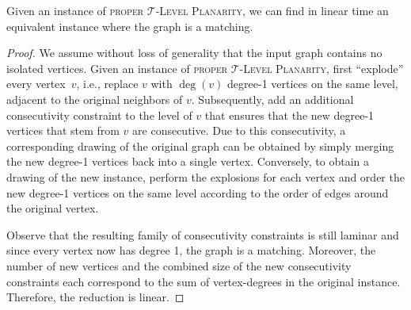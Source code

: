 \documentclass[runningheads]{llncs}
\newcommand{\tlp}{\textsc{proper $\mathcal T$-Level Planarity}\xspace}
\begin{document}
\begin{lemma}
  \label{lem:level-monotone}
  Given an instance of \tlp, we can find in linear time an equivalent instance where the graph is a matching.
\end{lemma}
\begin{proof}
  We assume without loss of generality that the input graph contains no isolated vertices.
  Given an instance of \tlp, first ``explode'' every vertex~$v$, i.e., replace $v$ with $\deg(v)$ degree-1 vertices on the same level, adjacent to the original neighbors of $v$.
  Subsequently, add an additional consecutivity constraint to the level of $v$ that ensures that the new degree-1 vertices that stem from $v$ are consecutive.
  Due to this consecutivity, a corresponding drawing of the original graph can be obtained by simply merging the new degree-1 vertices back into a single vertex.
  Conversely, to obtain a drawing of the new instance, perform the explosions for each vertex and order the new degree-1 vertices on the same level according to the order of edges around the original vertex.
  
  Observe that the resulting family of consecutivity constraints is still laminar and since every vertex now has degree 1, the graph is a matching.
  Moreover, the number of new vertices and the combined size of the new consecutivity constraints each correspond to the sum of vertex-degrees in the original instance.
  Therefore, the reduction is linear.
\end{proof}
\end{document}

